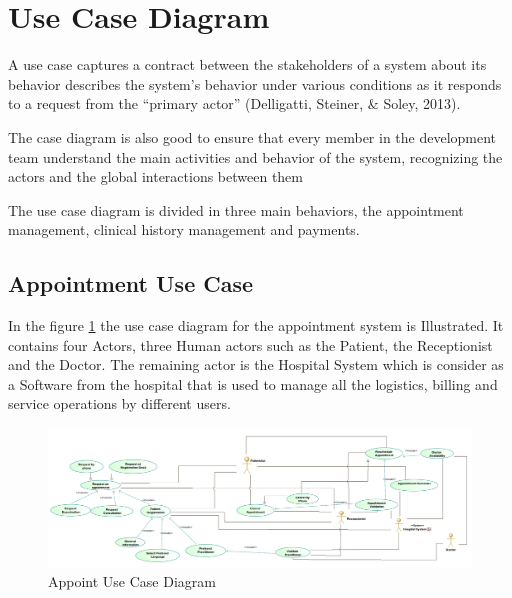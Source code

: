 \documentclass{article}
\begin{document}
            \newpage         
            \section{Use Case Diagram}

            A use case captures a contract between the stakeholders of a system about its behavior describes the
            system’s behavior under various conditions as it responds to a request from the “primary actor”
            (Delligatti, Steiner, & Soley, 2013). %

            The case diagram is also good to ensure that every member in the development team understand the main activities and behavior of the system,
            recognizing the actors and the global interactions between them

            The use case diagram is divided in three main behaviors, the appointment management, clinical history management and payments.

            \subsection{Appointment Use Case}

            In the figure \ref{fig:Appointment} the use case diagram for the appointment system is Illustrated. It contains four Actors, three Human actors such as the Patient, the Receptionist and the Doctor. 
            The remaining actor is the Hospital System which is consider as a Software from the hospital that is used to manage all the logistics, billing and service operations by different users.

            \begin{figure}[H]
                \centering 
                \includegraphics[width=1\linewidth]{./img/appointments.png}
                \caption{Appoint Use Case Diagram}
                \label{fig:Appointment}
            \end{figure}
\end{document}
